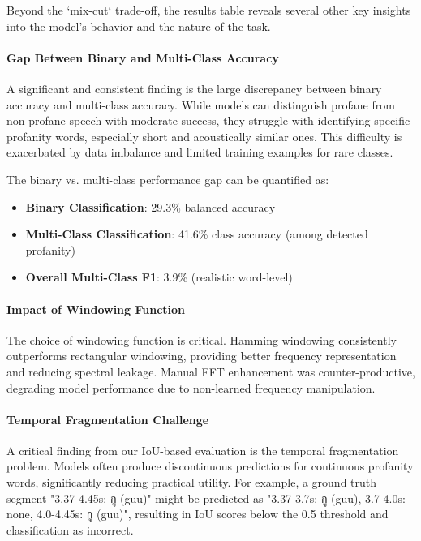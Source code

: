 \documentclass[11pt]{article}
\newcommand{\textthai}[1]{{\thaifont #1}}
\begin{document}
Beyond the `mix-cut` trade-off, the results table reveals several other key insights into the model's behavior and the nature of the task.

\paragraph{Gap Between Binary and Multi-Class Accuracy}
A significant and consistent finding is the large discrepancy between binary accuracy and multi-class accuracy. While models can distinguish profane from non-profane speech with moderate success, they struggle with identifying specific profanity words, especially short and acoustically similar ones. This difficulty is exacerbated by data imbalance and limited training examples for rare classes.

The binary vs. multi-class performance gap can be quantified as:
\begin{itemize}
    \item \textbf{Binary Classification}: 29.3\% balanced accuracy
    \item \textbf{Multi-Class Classification}: 41.6\% class accuracy (among detected profanity)
    \item \textbf{Overall Multi-Class F1}: 3.9\% (realistic word-level)
\end{itemize}

\paragraph{Impact of Windowing Function}
The choice of windowing function is critical. Hamming windowing consistently outperforms rectangular windowing, providing better frequency representation and reducing spectral leakage. Manual FFT enhancement was counter-productive, degrading model performance due to non-learned frequency manipulation.

\paragraph{Temporal Fragmentation Challenge}
A critical finding from our IoU-based evaluation is the temporal fragmentation problem. Models often produce discontinuous predictions for continuous profanity words, significantly reducing practical utility. For example, a ground truth segment "3.37-4.45s: \textthai{กู} (guu)" might be predicted as "3.37-3.7s: \textthai{กู} (guu), 3.7-4.0s: none, 4.0-4.45s: \textthai{กู} (guu)", resulting in IoU scores below the 0.5 threshold and classification as incorrect.
\end{document}
